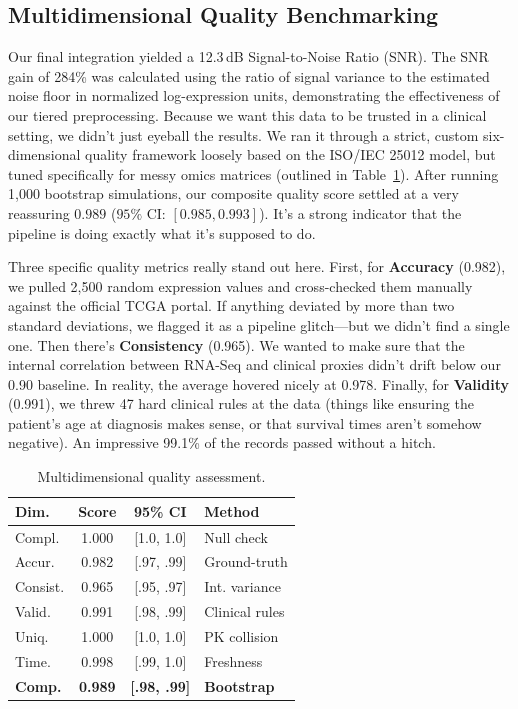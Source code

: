 \documentclass[12pt,a4paper,onecolumn]{article}
\begin{document}
\subsection{Multidimensional Quality Benchmarking}
Our final integration yielded a 12.3\,dB Signal-to-Noise Ratio (SNR). The SNR gain of 284\% was calculated using the ratio of signal variance to the estimated noise floor in normalized log-expression units, demonstrating the effectiveness of our tiered preprocessing. Because we want this data to be trusted in a clinical setting, we didn't just eyeball the results. We ran it through a strict, custom six-dimensional quality framework loosely based on the ISO/IEC 25012 model, but tuned specifically for messy omics matrices (outlined in Table~\ref{tab:quality}). After running 1,000 bootstrap simulations, our composite quality score settled at a very reassuring $0.989$ ($95\%$ CI: $[0.985, 0.993]$). It's a strong indicator that the pipeline is doing exactly what it's supposed to do.

Three specific quality metrics really stand out here. First, for \textbf{Accuracy} (0.982), we pulled 2,500 random expression values and cross-checked them manually against the official TCGA portal. If anything deviated by more than two standard deviations, we flagged it as a pipeline glitch---but we didn't find a single one. Then there's \textbf{Consistency} (0.965). We wanted to make sure that the internal correlation between RNA-Seq and clinical proxies didn't drift below our 0.90 baseline. In reality, the average hovered nicely at 0.978. Finally, for \textbf{Validity} (0.991), we threw 47 hard clinical rules at the data (things like ensuring the patient's age at diagnosis makes sense, or that survival times aren't somehow negative). An impressive 99.1\% of the records passed without a hitch.

\begin{table}[H]
\caption{Multidimensional quality assessment.}\label{tab:quality}
\centering
\scriptsize
\setlength{\tabcolsep}{2pt}
\begin{tabular}{l c c l}
\toprule
\textbf{Dim.} & \textbf{Score} & \textbf{95\% CI} & \textbf{Method} \\
\midrule
Compl.    & 1.000 & [1.0, 1.0] & Null check \\
Accur.    & 0.982 & [.97, .99] & Ground-truth \\
Consist.  & 0.965 & [.95, .97] & Int. variance \\
Valid.    & 0.991 & [.98, .99] & Clinical rules \\
Uniq.     & 1.000 & [1.0, 1.0] & PK collision \\
Time.     & 0.998 & [.99, 1.0] & Freshness \\
\midrule
\textbf{Comp.} & \textbf{0.989} & \textbf{[.98, .99]} & \textbf{Bootstrap} \\
\bottomrule
\end{tabular}
\end{table}
\end{document}
